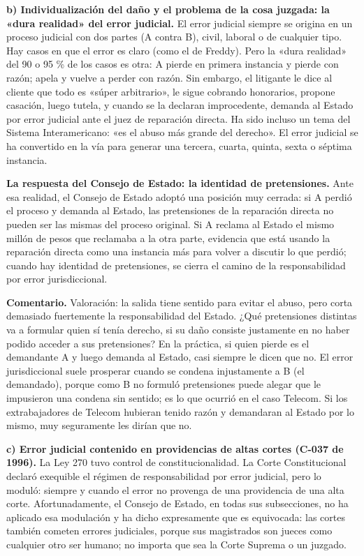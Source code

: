 \textbf{b) Individualización del daño y el problema de la cosa juzgada: la «dura realidad» del error judicial.} El error judicial siempre se origina en un proceso judicial con dos partes (A contra B), civil, laboral o de cualquier tipo. Hay casos en que el error es claro (como el de Freddy). Pero la «dura realidad» del 90 o 95 \% de los casos es otra: A pierde en primera instancia y pierde con razón; apela y vuelve a perder con razón. Sin embargo, el litigante le dice al cliente que todo es «súper arbitrario», le sigue cobrando honorarios, propone casación, luego tutela, y cuando se la declaran improcedente, demanda al Estado por error judicial ante el juez de reparación directa. Ha sido incluso un tema del Sistema Interamericano: «es el abuso más grande del derecho». El error judicial se ha convertido en la vía para generar una tercera, cuarta, quinta, sexta o séptima instancia.

\textbf{La respuesta del Consejo de Estado: la identidad de pretensiones.} Ante esa realidad, el Consejo de Estado adoptó una posición muy cerrada: si A perdió el proceso y demanda al Estado, las pretensiones de la reparación directa no pueden ser las mismas del proceso original. Si A reclama al Estado el mismo millón de pesos que reclamaba a la otra parte, evidencia que está usando la reparación directa como una instancia más para volver a discutir lo que perdió; cuando hay identidad de pretensiones, se cierra el camino de la responsabilidad por error jurisdiccional.

\begin{comentario}
\textcolor[HTML]{8A6D3B}{\textbf{Comentario. }}Valoración: la salida tiene sentido para evitar el abuso, pero corta demasiado fuertemente la responsabilidad del Estado. ¿Qué pretensiones distintas va a formular quien sí tenía derecho, si su daño consiste justamente en no haber podido acceder a sus pretensiones? En la práctica, si quien pierde es el demandante A y luego demanda al Estado, casi siempre le dicen que no. El error jurisdiccional suele prosperar cuando se condena injustamente a B (el demandado), porque como B no formuló pretensiones puede alegar que le impusieron una condena sin sentido; es lo que ocurrió en el caso Telecom. Si los extrabajadores de Telecom hubieran tenido razón y demandaran al Estado por lo mismo, muy seguramente les dirían que no.
\end{comentario}
\textbf{c) Error judicial contenido en providencias de altas cortes (C-037 de 1996).} La Ley 270 tuvo control de constitucionalidad. La Corte Constitucional declaró exequible el régimen de responsabilidad por error judicial, pero lo moduló: siempre y cuando el error no provenga de una providencia de una alta corte. Afortunadamente, el Consejo de Estado, en todas sus subsecciones, no ha aplicado esa modulación y ha dicho expresamente que es equivocada: las cortes también cometen errores judiciales, porque sus magistrados son jueces como cualquier otro ser humano; no importa que sea la Corte Suprema o un juzgado.

